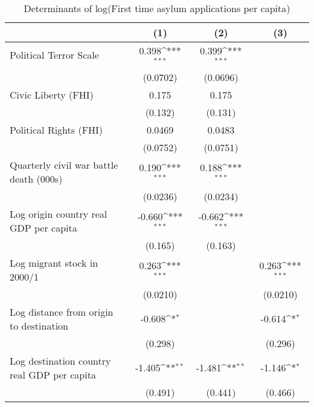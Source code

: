 \begin{table}[htbp]\centering
\def\sym#1{\ifmmode^{#1}\else\(^{#1}\)\fi}
\caption{Determinants of log(First time asylum applications per capita)}
\begin{tabular}{l*{3}{c}}
\hline\hline
                    &\multicolumn{1}{c}{(1)}         &\multicolumn{1}{c}{(2)}         &\multicolumn{1}{c}{(3)}         \\
\hline
Political Terror Scale&       0.398\sym{***}&       0.399\sym{***}&                     \\
                    &    (0.0702)         &    (0.0696)         &                     \\
[1em]
Civic Liberty (FHI) &       0.175         &       0.175         &                     \\
                    &     (0.132)         &     (0.131)         &                     \\
[1em]
Political Rights (FHI)&      0.0469         &      0.0483         &                     \\
                    &    (0.0752)         &    (0.0751)         &                     \\
[1em]
Quarterly civil war battle death (000s)&       0.190\sym{***}&       0.188\sym{***}&                     \\
                    &    (0.0236)         &    (0.0234)         &                     \\
[1em]
Log origin country real GDP per capita&      -0.660\sym{***}&      -0.662\sym{***}&                     \\
                    &     (0.165)         &     (0.163)         &                     \\
[1em]
Log migrant stock in 2000/1&       0.263\sym{***}&                     &       0.263\sym{***}\\
                    &    (0.0210)         &                     &    (0.0210)         \\
[1em]
Log distance from origin to destination&      -0.608\sym{*}  &                     &      -0.614\sym{*}  \\
                    &     (0.298)         &                     &     (0.296)         \\
[1em]
Log destination country real GDP per capita&      -1.405\sym{**} &      -1.481\sym{**} &      -1.146\sym{*}  \\
                    &     (0.491)         &     (0.441)         &     (0.466)         \\

\end{tabular}
\end{table}

